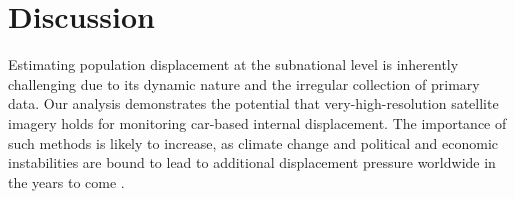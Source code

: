 \documentclass[sn-basic]{sn-jnl}%
\begin{document}






\section{Discussion}\label{Discussion}

Estimating population displacement at the subnational level is inherently challenging due to its dynamic nature and the irregular collection of primary data. Our analysis demonstrates the potential that very-high-resolution satellite imagery holds for monitoring car-based internal displacement. The importance of such methods is likely to increase, as climate change and political and economic instabilities are bound to lead to additional displacement pressure worldwide in the years to come \citep{IFRC_2021, IDMC_2023, UNHCR_2023b}.

\end{document}
